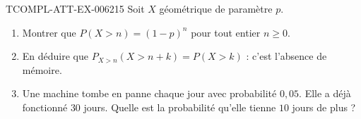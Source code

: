 \begin{exercice}{TCOMPL-ATT-EX-006}{2}{15}
Soit $X$ géométrique de paramètre $p$.
\begin{enumerate}
  \item Montrer que $P(X>n)=(1-p)^n$ pour tout entier $n\geq0$.
  \item En déduire que $P_{X>n}(X>n+k)=P(X>k)$ : c'est l'absence de mémoire.
  \item Une machine tombe en panne chaque jour avec probabilité $0{,}05$.
        Elle a déjà fonctionné $30$ jours. Quelle est la probabilité qu'elle
        tienne $10$ jours de plus ?
\end{enumerate}
\end{exercice}
